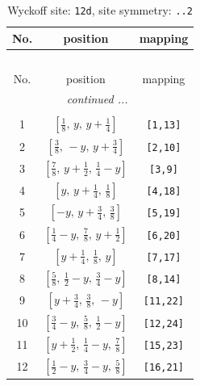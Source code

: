 \documentclass[fleqn,8pt]{jsarticle}
\begin{document}
\begin{longtable}{ccc}
\caption{Wyckoff site: {\tt 12d}, site symmetry: {\tt ..2}}
 \\
 \hline \hline
No. & position & mapping \\ \hline \endfirsthead

\multicolumn{2}{l}{\tablename\ \thetable{}} \\
 \hline \hline
No. & position & mapping \\ \hline \endhead

 \hline \hline
\multicolumn{2}{r}{\footnotesize\it continued ...} \\ \endfoot

 \hline \hline
\multicolumn{2}{r}{} \\ \endlastfoot

1 & $\left[ \frac{1}{8},\, y,\, y + \frac{1}{4} \right]$ & {\tt [1,13]} \\ \hline
2 & $\left[ \frac{3}{8},\, - y,\, y + \frac{3}{4} \right]$ & {\tt [2,10]} \\ \hline
3 & $\left[ \frac{7}{8},\, y + \frac{1}{2},\, \frac{1}{4} - y \right]$ & {\tt [3,9]} \\ \hline
4 & $\left[ y,\, y + \frac{1}{4},\, \frac{1}{8} \right]$ & {\tt [4,18]} \\ \hline
5 & $\left[ - y,\, y + \frac{3}{4},\, \frac{3}{8} \right]$ & {\tt [5,19]} \\ \hline
6 & $\left[ \frac{1}{4} - y,\, \frac{7}{8},\, y + \frac{1}{2} \right]$ & {\tt [6,20]} \\ \hline
7 & $\left[ y + \frac{1}{4},\, \frac{1}{8},\, y \right]$ & {\tt [7,17]} \\ \hline
8 & $\left[ \frac{5}{8},\, \frac{1}{2} - y,\, \frac{3}{4} - y \right]$ & {\tt [8,14]} \\ \hline
9 & $\left[ y + \frac{3}{4},\, \frac{3}{8},\, - y \right]$ & {\tt [11,22]} \\ \hline
10 & $\left[ \frac{3}{4} - y,\, \frac{5}{8},\, \frac{1}{2} - y \right]$ & {\tt [12,24]} \\ \hline
11 & $\left[ y + \frac{1}{2},\, \frac{1}{4} - y,\, \frac{7}{8} \right]$ & {\tt [15,23]} \\ \hline
12 & $\left[ \frac{1}{2} - y,\, \frac{3}{4} - y,\, \frac{5}{8} \right]$ & {\tt [16,21]} \\
\end{longtable}
\renewcommand{\arraystretch}{1.2}
\end{document}
